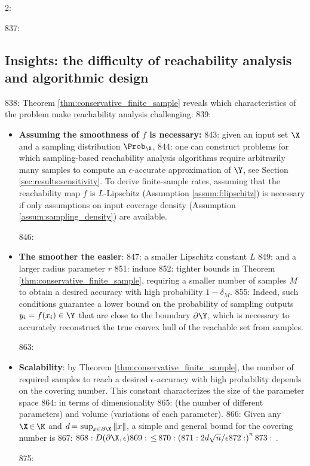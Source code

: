 2: \documentclass[12pt]{l4dc2022} %
\begin{document}
837: \subsection{Insights: the difficulty of reachability analysis and  algorithmic design}\label{sec:finite_sample:insights}
838: Theorem \ref{thm:conservative_finite_sample} reveals which characteristics of the problem make reachability analysis challenging: 
839: \begin{itemize}[leftmargin=4.5mm]
840:   \setlength\itemsep{0.0mm}%

842:     \item \textbf{Assuming the smoothness of $f$ is necessary:} %
843:     given an input set $\X$ and a sampling distribution $\Prob_{\X}$, %
844:     one can construct problems for which sampling-based reachability analysis algorithms require arbitrarily many samples to compute an $\epsilon$-accurate approximation of $\Y$, see Section \ref{sec:results:sensitivity}. To derive finite-sample rates, assuming that the reachability map $f$ is $L$-Lipschitz (Assumption \ref{assum:f:lipschitz}) is necessary if only  assumptions on input coverage density (Assumption \ref{assum:sampling_density}) are available.

846:     \item \textbf{The smoother the easier}: 
847: a smaller Lipschitz constant $L$ 
849: and a larger radius parameter $r$ 
851: induce 
852: tighter bounds in Theorem \ref{thm:conservative_finite_sample}, requiring a smaller number of samples $M$ to obtain a desired accuracy with high probability $1-\delta_M$. 
855: Indeed, such conditions guarantee a lower bound on the probability of sampling outputs $y_i=f(x_i)\in\Y$ that are close to the boundary $\partial\Y$, which is necessary to accurately reconstruct the true convex hull of the reachable set from samples.

863:     \item \textbf{Scalability}: by Theorem \ref{thm:conservative_finite_sample}, the number of required samples to reach a desired  $\epsilon$-accuracy with high probability depends on the covering number. This constant characterizes the size of the parameter space 
864:     in terms of dimensionality 
865:     (the number of different parameters) and volume (variations of each parameter). 
866:     Given any $\X\,{\in}\,\K$ and $d\,{=}\,\sup_{x\in\partial\X}\|x\|$, a simple and general bound for the covering number is  
867:     $
868:     D(\partial\X,\epsilon)
869:     \,{\leq}\,
870:     \left(
871:     2d\sqrt{n}/\epsilon
872:     \right)^n
873:     $ \citep{ShalevShwartz2009}.

875: \end{itemize}
\end{document}
